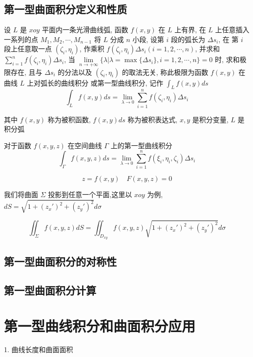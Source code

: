 \subsection{第一型曲面积分定义和性质}
\begin{definition}[第一型曲面积分]
	设 $L$ 是 $xoy$ 平面内一条光滑曲线弧, 函数 $f(x,y)$ 在 $L$ 上有界, 在 $L$ 上任意插入一系列的点 $M_{1}, M_{2}, \cdots, M_{n-1}$ 将 $L$ 分成 $n$ 小段, 设第 $i$ 段的弧长为 $\Delta s_{i}$, 
	在 第 $i$ 段上任意取一点 $(\zeta_{i},\eta_{i})$, 作乘积 $f(\zeta_{i},\eta_{i})\Delta s_{i}(i=1,2,\cdots,n)$, 并求和 $\sum\limits_{i=1}^{n}f(\zeta_{i},\eta_{i})\Delta s_{i}$, 当 
	$\lim\limits_{n \to +\infty}\{\lambda|\lambda = \max\{\Delta s_{i}\}, i =1,2,\cdots,n\} = 0$ 时, 求和极限存在, 
	且与 $\Delta s_{i}$ 的分法以及 $(\zeta_{i},\eta_{i})$ 的取法无关, 称此极限为函数 $f(x,y)$ 在曲线 $L$ 上对弧长的曲线积分
	或第一型曲线积分, 记作 $\int_{L}f(x,y)ds$
	$$\int_{L}f(x,y)ds = \lim\limits_{\lambda \to 0}\sum\limits_{i=1}^{n}f(\zeta_{i},\eta_{i})\Delta s_{i}$$ 

	其中 $f(x,y)$ 称为被积函数, $f(x,y)ds$ 称为被积表达式, $x,y$ 是积分变量, $L$ 是积分弧

	对于函数 $f(x,y,z)$ 在空间曲线 $\Gamma$ 上的第一型曲线积分
	$$\int_{\Gamma}f(x,y,z)ds = \lim\limits_{\lambda \to 0}\sum\limits_{i=1}^{n}f(\xi_{i},\eta_{i},\zeta_{i})\Delta s_{i}$$
\end{definition}
\begin{theorem}
	$$z=f(x,y)\quad F(x,y,z)=0$$
	
	我们将曲面 $\Sigma$ 投影到任意一个平面,这里以 $xoy$ 为例,$dS=\sqrt{1+(z_{x}')^2+(z_{y}')^2}d\sigma$
	
	$$\iint_{\Sigma}f(x,y,z)dS=\iint_{D_{xy}}f(x,y,z)\sqrt{1+(z_{x}')^2+(z_{y}')^2}d\sigma$$
\end{theorem}
\subsection{第一型曲面积分的对称性}

\subsection{第一型曲面积分计算}

\section{第一型曲线积分和曲面积分应用}
1. \textcolor{purplec}{曲线长度和曲面面积}

